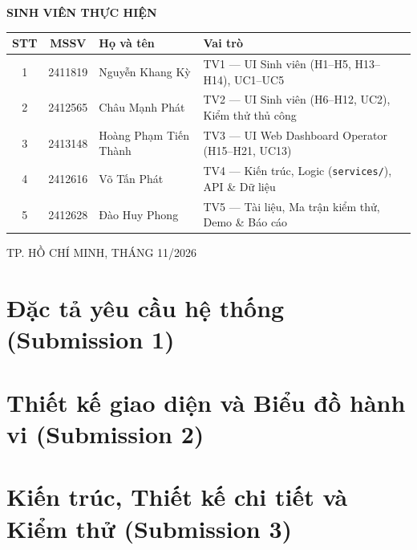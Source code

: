 \documentclass[a4paper]{article}
\theoremstyle{definition}
\begin{document}
\begin{titlepage}
\begin{center}
{\large \textbf{SINH VIÊN THỰC HIỆN}} \\[0.2cm]
\renewcommand{\arraystretch}{1.35}
\begin{tabular}{|c|c|l|l|}
\hline
\textbf{STT} & \textbf{MSSV} & \textbf{Họ và tên} & \textbf{Vai trò} \\
\hline
1 & 2411819 & Nguyễn Khang Kỳ & TV1 --- UI Sinh viên (H1--H5, H13--H14), UC1--UC5 \\
\hline
2 & 2412565 & Châu Mạnh Phát & TV2 --- UI Sinh viên (H6--H12, UC2), Kiểm thử thủ công \\
\hline
3 & 2413148 & Hoàng Phạm Tiến Thành & TV3 --- UI Web Dashboard Operator (H15--H21, UC13) \\
\hline
4 & 2412616 & Võ Tấn Phát & TV4 --- Kiến trúc, Logic (\texttt{services/}), API \& Dữ liệu \\
\hline
5 & 2412628 & Đào Huy Phong & TV5 --- Tài liệu, Ma trận kiểm thử, Demo \& Báo cáo \\
\hline
\end{tabular}
\end{center}

\vfill

\begin{center}
{\large TP. HỒ CHÍ MINH, THÁNG 11/2026}
\end{center}
\end{titlepage}
\restoregeometry
\setlength{\headwidth}{\textwidth}

\newpage



\newpage
\tableofcontents
\newpage
\listoffigures
\newpage
\listoftables
\newpage
\setcounter{page}{1}

\part{Đặc tả yêu cầu hệ thống (Submission 1)}

\newpage

\part{Thiết kế giao diện và Biểu đồ hành vi (Submission 2)}

\newpage

\part{Kiến trúc, Thiết kế chi tiết và Kiểm thử (Submission 3)}

\newpage

\newpage
\end{document}
